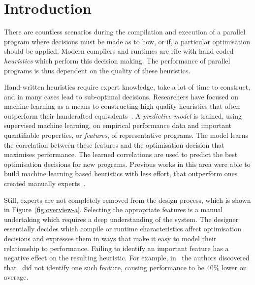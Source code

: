 \section{Introduction}

There are countless scenarios during the compilation and execution of a parallel program where decisions must be made as to how, or if, a particular optimisation should be applied. Modern compilers and runtimes are rife with hand coded \emph{heuristics} which perform this decision making. The performance of parallel programs is thus dependent on the quality of these heuristics.

Hand-written heuristics require expert knowledge, take a lot of time to construct, and in many cases lead to sub-optimal decisions. Researchers have focused on machine learning as a means to constructing high quality heuristics that often outperform their handcrafted equivalents~\cite{Micolet2016,Falch2015,Stephenson2005,Agakov,Cummins2015a}. A \emph{predictive model} is trained, using supervised machine learning, on empirical performance data and important quantifiable properties, or \emph{features}, of representative programs. The model learns the correlation between these features and the optimisation decision that maximises performance. The learned correlations are used to predict the best optimisation decisions for new programs. Previous works in this area were able to build machine learning based heuristics with less effort, that outperform ones created manually experts~\cite{Grewe2013,Magni2014}.

Still, experts are not completely removed from the design process, which is shown in Figure~\ref{fig:overview-a}. Selecting the appropriate features is a manual undertaking which requires a deep understanding of the system. The designer essentially decides which compile or runtime characteristics affect optimisation decisions and expresses them in ways that make it easy to model their relationship to performance. Failing to identify an important feature has a negative effect on the resulting heuristic. For example, in~\cite{Cummins2017a} the authors discovered that~\cite{Grewe2013} did not identify one such feature, causing performance to be 40\% lower on average.

